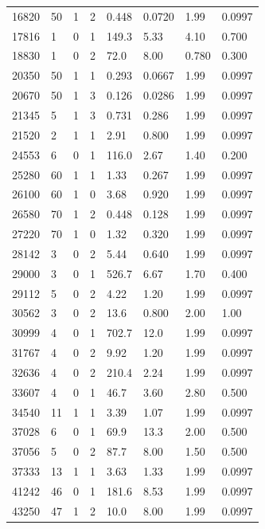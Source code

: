 \documentclass[preview]{standalone}
\begin{document}
{{\begin{tabular}{L{1.2cm}C{1.2cm} C{0.3cm}C{0.5cm} C{1.4cm}C{1.4cm} C{1.4cm}C{1.4cm}}
  16820  &    50  & 1     &  2 &  0.448  & 0.0720  & 1.99 &  0.0997   \\ 
  17816  &     1  & 0     &  1 &  149.3  & 5.33  & 4.10 &  0.700   \\ 
  18830  &     1  & 0     &  2 &  72.0  & 8.00  & 0.780 &  0.300   \\ 
  20350  &    50  & 1     &  1 &  0.293  & 0.0667  & 1.99 &  0.0997   \\ 
  20670  &    50  & 1     &  3 &  0.126  & 0.0286  & 1.99 &  0.0997   \\ 
  21345  &     5  & 1     &  3 &  0.731  & 0.286  & 1.99 &  0.0997   \\ 
  21520  &     2  & 1     &  1 &  2.91  & 0.800  & 1.99 &  0.0997   \\ 
  24553  &     6  & 0     &  1 &  116.0  & 2.67  & 1.40 &  0.200   \\ 
  25280  &    60  & 1     &  1 &  1.33  & 0.267  & 1.99 &  0.0997   \\ 
  26100  &    60  & 1     &  0 &  3.68  & 0.920  & 1.99 &  0.0997   \\ 
  26580  &    70  & 1     &  2 &  0.448  & 0.128  & 1.99 &  0.0997   \\ 
  27220  &    70  & 1     &  0 &  1.32  & 0.320  & 1.99 &  0.0997   \\ 
  28142  &     3  & 0     &  2 &  5.44  & 0.640  & 1.99 &  0.0997   \\ 
  29000  &     3  & 0     &  1 &  526.7  & 6.67  & 1.70 &  0.400   \\ 
  29112  &     5  & 0     &  2 &  4.22  & 1.20  & 1.99 &  0.0997   \\ 
  30562  &     3  & 0     &  2 &  13.6  & 0.800  & 2.00 &  1.00   \\ 
  30999  &     4  & 0     &  1 &  702.7  & 12.0  & 1.99 &  0.0997   \\ 
  31767  &     4  & 0     &  2 &  9.92  & 1.20  & 1.99 &  0.0997   \\ 
  32636  &     4  & 0     &  2 &  210.4  & 2.24  & 1.99 &  0.0997   \\ 
  33607  &     4  & 0     &  1 &  46.7  & 3.60  & 2.80 &  0.500   \\ 
  34540  &    11  & 1     &  1 &  3.39  & 1.07  & 1.99 &  0.0997   \\ 
  37028  &     6  & 0     &  1 &  69.9  & 13.3  & 2.00 &  0.500   \\ 
  37056  &     5  & 0     &  2 &  87.7  & 8.00  & 1.50 &  0.500   \\ 
  37333  &    13  & 1     &  1 &  3.63  & 1.33  & 1.99 &  0.0997   \\ 
  41242  &    46  & 0     &  1 &  181.6  & 8.53  & 1.99 &  0.0997   \\ 
  43250  &    47  & 1     &  2 &  10.0  & 8.00  & 1.99 &  0.0997   \\ 
\hline 
\end{tabular} 

}}
\end{document}
